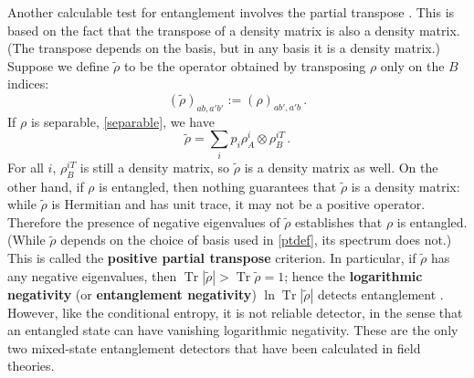 \documentclass[11pt]{article}
\DeclareMathOperator{\Tr}{Tr}
\begin{document}
Another calculable test for entanglement involves the partial transpose \cite{PhysRevLett.77.1413,HORODECKI19961}. This is based on the fact that the transpose of a density matrix is also a density matrix. (The transpose depends on the basis, but in any basis it is a density matrix.) Suppose we define $\tilde\rho$ to be the operator obtained by transposing $\rho$ only on the $B$ indices:
\begin{equation}\label{ptdef}
(\tilde\rho)_{ab,a'b'}:=(\rho)_{ab',a'b}\,.
\end{equation}
If $\rho$ is separable, \eqref{separable}, we have
\begin{equation}
\tilde\rho = \sum_ip_i\rho_A^i\otimes\rho_B^{iT}\,.
\end{equation}
For all $i$, $\rho_B^{iT}$ is still a density matrix, so $\tilde\rho$ is a density matrix as well. On the other hand, if $\rho$ is entangled, then nothing guarantees that $\tilde\rho$ is a density matrix: while $\tilde\rho$ is Hermitian and has unit trace, it may not be a positive operator. Therefore the presence of negative eigenvalues of $\tilde\rho$ establishes that $\rho$ is entangled. (While $\tilde\rho$ depends on the choice of basis used in \eqref{ptdef}, its spectrum does not.) This is called the \textbf{positive partial transpose} criterion. In particular, if $\tilde\rho$ has any negative eigenvalues, then $\Tr|\tilde\rho|>\Tr\tilde\rho=1$; hence the \textbf{logarithmic negativity} (or \textbf{entanglement negativity}) $\ln\Tr|\tilde\rho|$ detects entanglement \cite{PhysRevA.65.032314}. However, like the conditional entropy, it is not reliable detector, in the sense that an entangled state can have vanishing logarithmic negativity. These are the only two mixed-state entanglement detectors that have been calculated in field theories.
\end{document}
